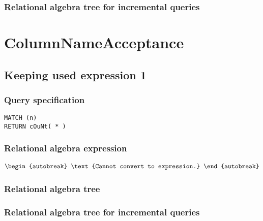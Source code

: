 
\subsubsection*{Relational algebra tree for incremental queries}

\section{ColumnNameAcceptance}


\subsection{Keeping used expression 1}

\subsubsection*{Query specification}

\begin{lstlisting}
MATCH (n)
RETURN cOuNt( * )
\end{lstlisting}

\subsubsection*{Relational algebra expression}

\begin{align*}
\begin{autobreak}
\text{Cannot convert to expression.}
\end{autobreak}
\end{align*}

\subsubsection*{Relational algebra tree}


\subsubsection*{Relational algebra tree for incremental queries}


